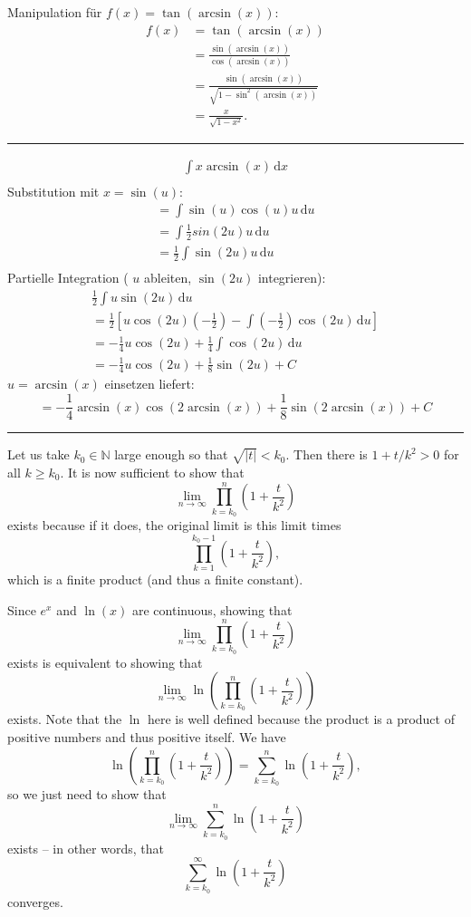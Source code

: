 \documentclass[a4paper,fontsize = 7pt]{scrartcl}
\begin{document}
Manipulation für $f(x) = \tan(\arcsin (x))$:
\begin{align*}
  f(x)&=\tan(\arcsin (x))\\
  &=\frac{\sin(\arcsin(x))}{\cos(\arcsin(x))}\\
  &=\frac{\sin(\arcsin(x))}{\sqrt{1-\sin^2(\arcsin(x))}}\\
  &=\frac{x}{\sqrt{1-x^2}}.
  \end{align*}

\vspace{0.1 cm}
\hrule
\vspace{0.2 cm}
\begin{align*}
  \int x\arcsin(x)\,\mathrm dx\\
\end{align*}
Substitution mit $ x = \sin(u) $:
\begin{align*}
  =\int \sin(u)\cos(u) u \, \mathrm du\\
  = \int \frac{1}{2} sin(2u) u \, \mathrm du\\
  = \frac{1}{2} \int \sin(2u) u \, \mathrm du\\
\end{align*}
 Partielle Integration ( $u$ ableiten, $\sin(2u)$ integrieren):
 \begin{align*}
  \frac{1}{2} \int u \sin(2u)\, \mathrm du \\ 
  = \frac{1}{2} \left[ u \cos(2u)  \left(-\frac{1}{2}\right) - \int \left(-\frac{1}{2}\right) \cos(2u) \, \mathrm du \right] \\ 
  =-\frac{1}{4} u \cos(2u) + \frac{1}{4} \int \cos(2u) \, \mathrm du\\
  = -\frac{1}{4} u \cos(2u) + \frac{1}{8} \sin(2u) + C
\end{align*}
$u = \arcsin(x)$ einsetzen liefert:
$$= -\frac{1}{4} \arcsin(x) \cos(2\arcsin(x)) + \frac{1}{8} \sin(2\arcsin(x)) + C$$

\vspace{0.1 cm}
\hrule
\vspace{0.2 cm}

Let us take $k_0\in\mathbb N$ large enough so that $\sqrt{\lvert t\rvert}<k_0$. Then there is $1+t/k^2>0$ for all $k\geq k_0$. It is now sufficient to show that
$$
\lim_{n\to\infty}\prod_{k=k_0}^n\left(1+\frac t{k^2}\right)
$$
exists because if it does, the original limit is this limit times
$$
\prod_{k=1}^{k_0-1}\left(1+\frac t{k^2}\right),
$$
which is a finite product (and thus a finite constant).

Since $e^x$ and $\ln(x)$ are continuous, showing that
$$
\lim_{n\to\infty}\prod_{k=k_0}^n\left(1+\frac t{k^2}\right)
$$
exists is equivalent to showing that
$$
\lim_{n\to\infty}\ln\left(\prod_{k=k_0}^n\left(1+\frac t{k^2}\right)\right)
$$
exists. Note that the $\ln$ here is well defined because the product is a product of positive numbers and thus positive itself. We have
$$
\ln\left(\prod_{k=k_0}^n\left(1+\frac t{k^2}\right)\right)=\sum_{k=k_0}^n\ln\left(1+\frac t{k^2}\right),
$$
so we just need to show that
$$
\lim_{n\to\infty}\sum_{k=k_0}^n\ln\left(1+\frac t{k^2}\right)
$$
exists -- in other words, that
$$
\sum_{k=k_0}^\infty\ln\left(1+\frac t{k^2}\right)
$$
converges.
\end{document}

